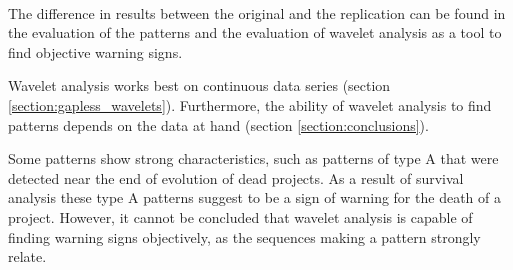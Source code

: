 \paragraph{}
The difference in results between the original and the replication can be found
in the evaluation of the patterns and the evaluation of wavelet analysis as a
tool to find objective warning signs.

Wavelet analysis works best on continuous data series (section
\ref{section:gapless_wavelets}). Furthermore, the ability of wavelet analysis
to find patterns depends on the data at hand (section \ref{section:conclusions}).

Some patterns show strong characteristics, such as patterns of type A that were
detected near the end of evolution of dead projects. As a result of survival
analysis these type A patterns suggest to be a sign of warning for the death
of a project. However, it cannot be concluded that wavelet analysis is capable
of finding warning signs objectively, as the sequences making a pattern
strongly relate.

\begin{comment}
About original study:
- research questions
- participants
- design
- artifacts
- context variables
- summary of results

About replication:
- motivation
- level of interaction with original researchers
- changes to the original experiment

Comparison of results:
- consistent results
- differences in results

Conclude across studies.

\end{comment}